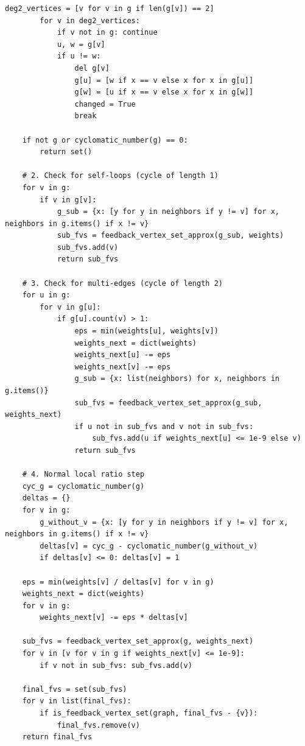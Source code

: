 \begin{lstlisting}[style=python, caption=Local Ratio Algorithm for Feedback Vertex Set]
        deg2_vertices = [v for v in g if len(g[v]) == 2]
        for v in deg2_vertices:
            if v not in g: continue
            u, w = g[v]
            if u != w:
                del g[v]
                g[u] = [w if x == v else x for x in g[u]]
                g[w] = [u if x == v else x for x in g[w]]
                changed = True
                break

    if not g or cyclomatic_number(g) == 0:
        return set()

    # 2. Check for self-loops (cycle of length 1)
    for v in g:
        if v in g[v]:
            g_sub = {x: [y for y in neighbors if y != v] for x, neighbors in g.items() if x != v}
            sub_fvs = feedback_vertex_set_approx(g_sub, weights)
            sub_fvs.add(v)
            return sub_fvs

    # 3. Check for multi-edges (cycle of length 2)
    for u in g:
        for v in g[u]:
            if g[u].count(v) > 1:
                eps = min(weights[u], weights[v])
                weights_next = dict(weights)
                weights_next[u] -= eps
                weights_next[v] -= eps
                g_sub = {x: list(neighbors) for x, neighbors in g.items()}
                sub_fvs = feedback_vertex_set_approx(g_sub, weights_next)
                if u not in sub_fvs and v not in sub_fvs:
                    sub_fvs.add(u if weights_next[u] <= 1e-9 else v)
                return sub_fvs

    # 4. Normal local ratio step
    cyc_g = cyclomatic_number(g)
    deltas = {}
    for v in g:
        g_without_v = {x: [y for y in neighbors if y != v] for x, neighbors in g.items() if x != v}
        deltas[v] = cyc_g - cyclomatic_number(g_without_v)
        if deltas[v] <= 0: deltas[v] = 1

    eps = min(weights[v] / deltas[v] for v in g)
    weights_next = dict(weights)
    for v in g:
        weights_next[v] -= eps * deltas[v]
        
    sub_fvs = feedback_vertex_set_approx(g, weights_next)
    for v in [v for v in g if weights_next[v] <= 1e-9]:
        if v not in sub_fvs: sub_fvs.add(v)
            
    final_fvs = set(sub_fvs)
    for v in list(final_fvs):
        if is_feedback_vertex_set(graph, final_fvs - {v}):
            final_fvs.remove(v)
    return final_fvs
\end{lstlisting}


